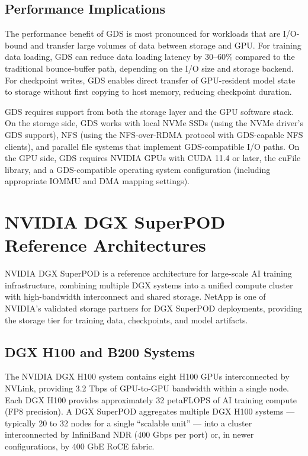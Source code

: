 \subsection{Performance Implications}

The performance benefit of GDS is most pronounced for workloads that are I/O-bound and transfer large volumes of data between storage and GPU. For training data loading, GDS can reduce data loading latency by 30--60\% compared to the traditional bounce-buffer path, depending on the I/O size and storage backend. For checkpoint writes, GDS enables direct transfer of GPU-resident model state to storage without first copying to host memory, reducing checkpoint duration.

GDS requires support from both the storage layer and the GPU software stack. On the storage side, GDS works with local NVMe SSDs (using the NVMe driver's GDS support), NFS (using the NFS-over-RDMA protocol with GDS-capable NFS clients), and parallel file systems that implement GDS-compatible I/O paths. On the GPU side, GDS requires NVIDIA GPUs with CUDA 11.4 or later, the cuFile library, and a GDS-compatible operating system configuration (including appropriate IOMMU and DMA mapping settings).

\section{NVIDIA DGX SuperPOD Reference Architectures}

NVIDIA DGX SuperPOD is a reference architecture for large-scale AI training infrastructure, combining multiple DGX systems into a unified compute cluster with high-bandwidth interconnect and shared storage. NetApp is one of NVIDIA's validated storage partners for DGX SuperPOD deployments, providing the storage tier for training data, checkpoints, and model artifacts.

\subsection{DGX H100 and B200 Systems}

The NVIDIA DGX H100 system contains eight H100 GPUs interconnected by NVLink, providing 3.2 Tbps of GPU-to-GPU bandwidth within a single node. Each DGX H100 provides approximately 32 petaFLOPS of AI training compute (FP8 precision). A DGX SuperPOD aggregates multiple DGX H100 systems --- typically 20 to 32 nodes for a single ``scalable unit'' --- into a cluster interconnected by InfiniBand NDR (400 Gbps per port) or, in newer configurations, by 400 GbE RoCE fabric.

